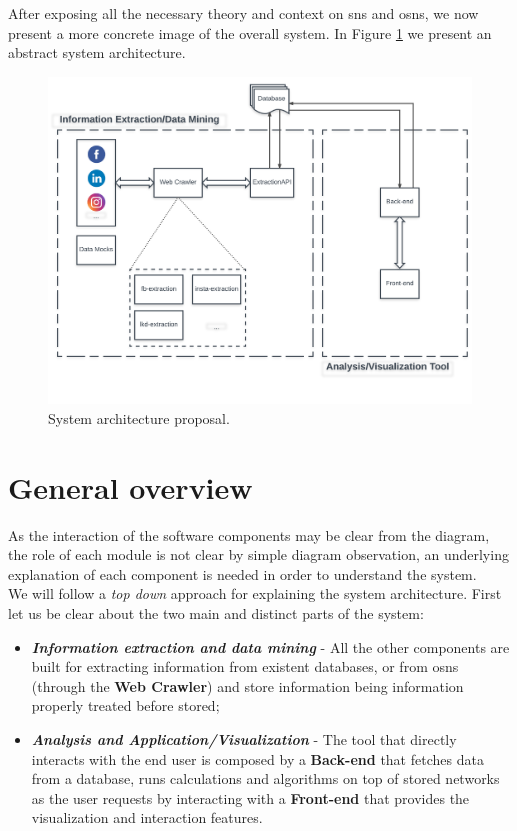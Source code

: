After exposing all the necessary theory and context on \glspl{sn} and \glspl{osn}, we now present a more concrete image of the overall system. In Figure \ref{img:architectureprop} we present an abstract system architecture.

\begin{figure}[h!]
\begin{center}
  \hspace*{-0.3in}
  \includegraphics[width=1.1\textwidth]{img/architecture.png}
\end{center}
\caption{\label{img:architectureprop} System architecture proposal.}
\end{figure}

\section{General overview}
As the interaction of the software components may be clear from the diagram, the role of each module is not clear by simple
diagram observation, an underlying explanation of each component is needed in order to understand the system.\\
\indent We will follow a \textit{top down} approach for explaining the system architecture. First let us be clear about the two
main and distinct parts of the system:
\begin{itemize}
    \item \textbf{\textit{Information extraction and data mining}} - All the other components are built for extracting information
    from existent databases, or from \glspl{osn} (through the \textbf{Web Crawler}) and store information being information properly treated before stored;
    \item \textbf{\textit{Analysis and Application/Visualization}} - The tool that directly interacts with the end user is composed by a \textbf{Back-end} that fetches data from a database, runs calculations and algorithms on top of stored networks as the user requests by interacting with a \textbf{Front-end} that provides the visualization and interaction features.
\end{itemize}


